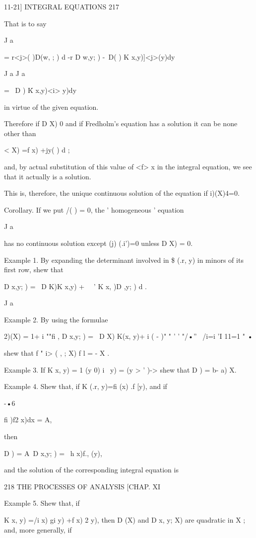 11-21] INTEGRAL EQUATIONS 217 

That is to say 

J a 

= r<j>( )D(w, ; ) d -r D w,y; ) -\ D( ) K x,y)]<j>(y)dy 

J a J a 

= \ D  ) \' K x,y)<i> y)dy 

in virtue of the given equation. 

Therefore if D X) 0 and if Fredholm's equation has a solution it can be 
none other than 

<   X) =f x) +jy( )    d  ; 

and, by actual substitution of this value of <f> x  in the integral equation, 
we see that it actually is a solution. 

This is, therefore, the unique continuous solution of the equation if 
i)(X)4=0. 

Corollary. If we put /( ) = 0, the ' homogeneous ' equation 

J a 

has no continuous solution except (j) (.i')=0 unless D X) = 0. 

Example 1. By expanding the determinant involved in \$  (.r, y) in minors of its first 
row, shew that 

D x,y;  )  = \ D K)K x,y) + \ \ ' K x, )D  ,y;  ) d . 

J a 

Example 2. By using the formulae 

2)(X) = 1+ i ""fi , D x,y;  )  = \ D  X) K(x, y)+ i ( - )"  " ' '  "/•''  \ 
/i=i 'I   11=1 " • 

shew that f " i> ( ,   ; X) f l = - X    . 

Example 3. If K  x, y) = 1 (y  0)   i \ y) =   (y > ' )-> 
shew that D  ) =  b- a) X. 

Example 4. Shew that, if K (.r, y)=fi (x) .f  [y), and if 

-•6 

fi  )f2 x)dx = A, 



then 

D  )  =  A\ D x,y; )  = \ h  x)f., (y), 

and the solution of the corresponding integral equation is 



218 THE PROCESSES OF ANALYSIS [CHAP. XI 

Example 5. Shew that, if 

K  x, y) =/i  x) gi  y) +f   x)  2  y), 
then D (X) and D  x, y; X) are quadratic in X ; and, more generally, if 

